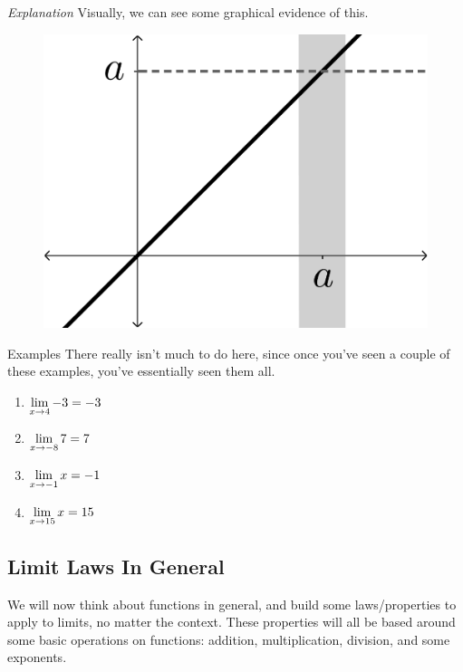 \begin{enumerate}
\begin{describe}{\textit{Explanation}}
    Visually, we can see some graphical evidence of this.
    \begin{figure}[h!tb]
      \includegraphics[scale=0.5]{./1_limits/images/1-2_graph2.png}
      \centering
    \end{figure}
  \end{describe}
\end{enumerate}

\begin{note}{Examples}
  There really isn't much to do here, since once you've seen a couple of these examples, you've essentially seen them all.

  \begin{enumerate}
    \item $\displaystyle \lim_{x\to 4} -3 = -3$
    \item $\displaystyle \lim_{x\to -8} 7 = 7$
    \item $\displaystyle \lim_{x\to -1} x = -1$
    \item $\displaystyle \lim_{x\to 15} x = 15$
  \end{enumerate}
\end{note}

\subsection*{Limit Laws In General}

We will now think about functions in general, and build some laws/properties to apply to limits, no matter the context.
These properties will all be based around some basic operations on functions: addition, multiplication, division, and some exponents.

